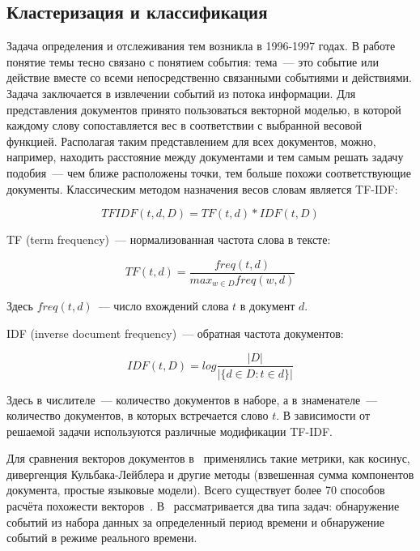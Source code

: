 \subsection{Кластеризация и классификация}

Задача определения и отслеживания тем возникла в 1996-1997 годах. В работе~\cite{Allan98topicdetection} понятие темы тесно связано с понятием события: тема~--- это событие или действие вместе со всеми непосредственно связанными событиями и действиями. Задача заключается в извлечении событий из потока информации. 
Для представления документов принято пользоваться векторной моделью, в которой каждому слову сопоставляется вес в  соответствии с выбранной весовой функцией. Располагая таким представлением для всех документов, можно, например, находить расстояние между документами и тем самым решать задачу подобия~--- чем ближе расположены точки, тем больше похожи соответствующие документы. Классическим методом назначения весов словам является TF-IDF:

\begin{equation} \label{eq:tfidf}
TFIDF(t,d,D)=TF(t,d)*IDF(t,D)
\end{equation}

\noindent
TF (term frequency)~--- нормализованная частота слова в тексте: 

\begin{equation}\label{eq:tf}
TF(t,d)=\frac{freq(t,d)}{max_{w\in D}freq(w,d)}
\end{equation}

\noindent
Здесь $freq(t,d)$~--- число вхождений слова $t$ в документ $d$.

\noindent
IDF (inverse document frequency)~--- обратная частота документов: 

\begin{equation}\label{eq:idf}
IDF(t,D)=log\frac{|D|}{|\{d\in D:t\in d\}|}
\end{equation}

\noindent
Здесь в числителе~--- количество документов в наборе, а в знаменателе~--- количество документов, в которых встречается слово $t$. В зависимости от решаемой задачи используются различные модификации TF-IDF.  

Для сравнения векторов документов в~\cite{Allan98topicdetection} применялись такие метрики, как косинус, дивергенция Кульбака-Лейблера и другие методы (взвешенная сумма компонентов документа, простые языковые модели). Всего существует более 70 способов расчёта похожести векторов~\cite{choi2010survey}. В~\cite{Allan98topicdetection} рассматривается два типа задач: обнаружение событий из набора данных за определенный период времени и обнаружение событий в режиме реального времени.

